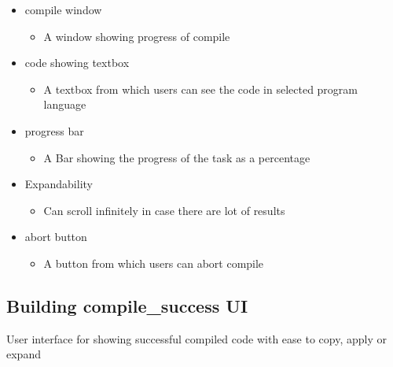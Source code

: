 \documentclass[conference]{IEEEtran}
\begin{document}
\begin{itemize} 
  \item compile window
  \begin{itemize}
    \item A window showing progress of compile
  \end{itemize}
  \item code showing textbox
  \begin{itemize}
    \item A textbox from which users can see the code in selected program language
  \end{itemize}
  \item progress bar
  \begin{itemize}
    \item A Bar showing the progress of the task as a percentage
  \end{itemize}
  \item Expandability   
  \begin{itemize}
    \item Can scroll infinitely in case there are lot of results
  \end{itemize}
  \item abort button
  \begin{itemize}
    \item A button from which users can abort compile
  \end{itemize}
\end{itemize}
\textit{ }


\subsection{Building compile\_success UI}
 User interface for showing successful compiled code with ease to copy, apply or expand
\end{document}
